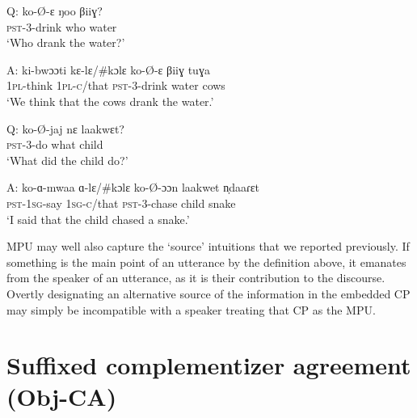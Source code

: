 \documentclass[output=paper,newtxmath,modfonts,nonflat,hidelinks]{langsci/langscibook}
\begin{document}
\ea \label{MPU Examples} 
\begin{xlist}

\ex
\gll Q: ko-\O-ɛ ŋoo βiiɣ? \\
{} \textsc{pst}-3-drink who water \\
\glt \hspace{0.16in} `Who drank the water?'

\gll A: ki-bwɔɔti kɛ-lɛ/\#kɔlɛ ko-\O-ɛ βiiɣ tuɣa \\
{} 1\textsc{pl}-think 1\textsc{pl-c}/that \textsc{pst}-3-drink water cows \\
\glt \hspace{0.16in} `We think that the cows drank the water.'

\ex 
\gll Q: ko-\O-jaj nɛ laakwɛt? \\
{} \textsc{pst}-3-do what child \\
\glt \hspace{0.16in} `What did the child do?'

\gll A: ko-ɑ-mwaa ɑ-lɛ/\#kɔlɛ ko-\O-ɔɔn laakwet n̩daaɾɛt \\
{} \textsc{pst}-1\textsc{sg}-say 1\textsc{sg-c}/that \textsc{pst}-3-chase child snake \\
 \glt \hspace{0.16in} `I said that the child chased a snake.'

\end{xlist}
\z

\noindent MPU may well also capture the `source' intuitions that we reported previously. If something is the main point of an utterance by the definition above, it emanates from the speaker of an utterance, as it is their contribution to the discourse. Overtly designating an alternative source of the information in the embedded CP may simply be incompatible with a speaker treating that CP as the MPU. 



\section{Suffixed complementizer agreement (Obj-CA)} \label{ObjCASect}

\end{document}
